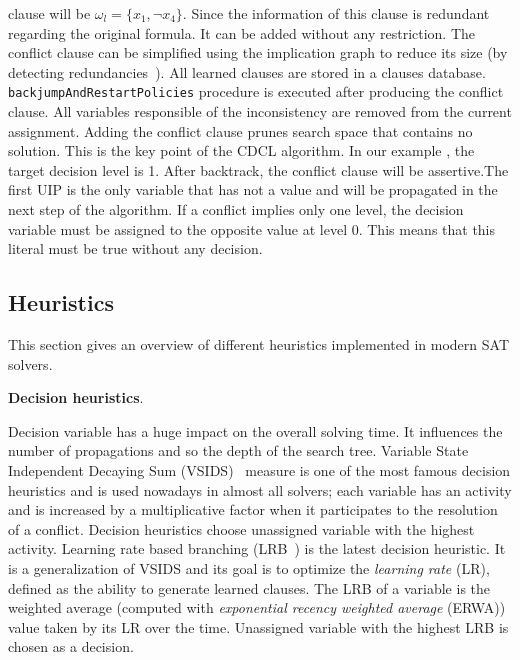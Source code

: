 clause will be $\omega_l = \{x_1, \neg x_4 \}$. Since the information of this clause is redundant regarding 
the original formula. It can be added without any  restriction. The conflict clause can be simplified
using the implication graph to reduce its size (by detecting redundancies~\cite{sorensson2009minimizing}).
 All learned clauses are stored in a clauses database. \texttt{backjumpAndRestartPolicies} procedure is executed after producing the conflict clause.
All  variables responsible of the inconsistency are removed from the current assignment.
Adding the conflict clause prunes search space that contains no solution. This is the key point of the CDCL algorithm. In our example , the target decision level is 1.
After backtrack, the conflict clause will be assertive.The first UIP is the only variable that 
has not a value and will be propagated in the next step of the  algorithm.
If a conflict implies only one level, the decision variable must be assigned 
to the opposite value at level 0. This means that this literal must be true without any decision.
 
 
\subsection{Heuristics}\label{sec:heuristics}
This section gives an overview of different heuristics implemented in modern SAT solvers.

\textbf{Decision heuristics}.

 Decision variable has a huge impact on the 
overall solving time. It influences the number of propagations and so 
the depth of the search tree.
 Variable State Independent Decaying Sum (VSIDS)~\cite{moskewicz2001chaff} measure is one of the most famous decision heuristics and is used
nowadays in almost all solvers; each variable has an activity and  is increased by a multiplicative factor 
when it participates to the resolution of a conflict.
Decision heuristics choose unassigned variable with the highest activity.
Learning rate based branching (LRB~\cite{liang2016learning}) is the latest decision heuristic. It is a
generalization of VSIDS and its goal is to optimize the \emph{learning rate} (LR), defined as the ability to generate
learned clauses. The LRB of a variable is the weighted average (computed with \emph{exponential recency
weighted average} (ERWA))  value taken by its LR over the time. Unassigned variable with the highest LRB is chosen as a decision. 

